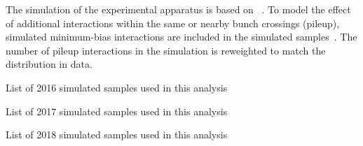 The simulation of the experimental apparatus is based on \GEANTfour~\cite{Sim:geant4}.
To model the effect of additional \pp interactions within the same or nearby bunch crossings (pileup), simulated minimum-bias interactions are included in the simulated samples~\cite{Sim:pileup}.
The number of pileup interactions in the simulation is reweighted to match the distribution in data.
\begin{table}[H]
    \caption{List of 2016 simulated samples used in this analysis}
    \label{tab:mc_list_16}
    \centering
    \resizebox{\textwidth}{!}{
        
    }
\end{table}
\begin{table}[H]
    \caption{List of 2017 simulated samples used in this analysis}
    \label{tab:mc_list_17}
    \centering
    \resizebox{\textwidth}{!}{
        
    }
\end{table}
\begin{table}[H]
    \caption{List of 2018 simulated samples used in this analysis}
    \label{tab:mc_list_18}
    \centering
    \resizebox{\textwidth}{!}{
        
    }
\end{table}
